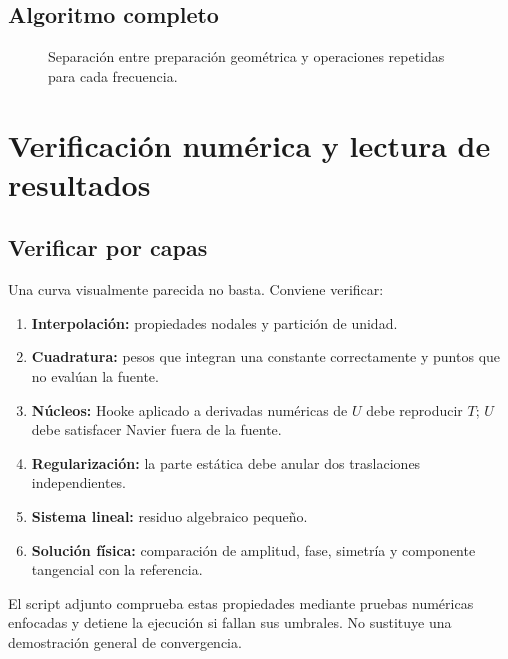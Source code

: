 \documentclass[11pt,a4paper]{report}
\numberwithin{equation}{chapter}
\newcommand{\vect}[1]{\bm{#1}}
\begin{document}
\section{Algoritmo completo}
\begin{figure}[htbp]
\centering
{}
\caption{Separaci\'on entre preparaci\'on geom\'etrica y operaciones
repetidas para cada frecuencia.}
\end{figure}

\chapter{Verificaci\'on num\'erica y lectura de resultados}
\label{ch:verificacion}

\section{Verificar por capas}
Una curva visualmente parecida no basta. Conviene verificar:
\begin{enumerate}
 \item \textbf{Interpolaci\'on:} propiedades nodales y partici\'on de unidad.
 \item \textbf{Cuadratura:} pesos que integran una constante correctamente
 y puntos que no eval\'uan la fuente.
 \item \textbf{N\'ucleos:} Hooke aplicado a derivadas num\'ericas de $U$
 debe reproducir $T$; $U$ debe satisfacer Navier fuera de la fuente.
 \item \textbf{Regularizaci\'on:} la parte est\'atica debe anular dos
 traslaciones independientes.
 \item \textbf{Sistema lineal:} residuo algebraico peque\~no.
 \item \textbf{Soluci\'on f\'isica:} comparaci\'on de amplitud, fase,
 simetr\'ia y componente tangencial con la referencia.
\end{enumerate}
El script adjunto comprueba estas propiedades mediante pruebas
num\'ericas enfocadas y detiene la ejecuci\'on si fallan sus umbrales.
No sustituye una demostraci\'on general de convergencia.
\end{document}
